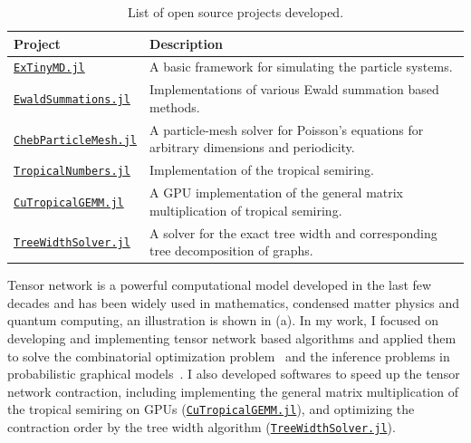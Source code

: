 \begin{table}[!htb]
    \centering
    \begin{tabular}{|l|l|}
        \hline
        \textbf{Project} & \textbf{Description} \\
        \hline
        \href{https://github.com/HPMolSim/ExTinyMD.jl}{\texttt{ExTinyMD.jl}} & A basic framework for simulating the particle systems. \\
        \hline
        \href{https://github.com/HPMolSim/EwaldSummations.jl}{\texttt{EwaldSummations.jl}} & Implementations of various Ewald summation based methods. \\
        \hline
        \href{https://github.com/HPMolSim/ChebParticleMesh.jl}{\texttt{ChebParticleMesh.jl}} & A particle-mesh solver for Poisson's equations for arbitrary dimensions and periodicity. \\
        \hline
        \href{https://github.com/TensorBFS/TropicalNumbers.jl}{\texttt{TropicalNumbers.jl}} & Implementation of the tropical semiring. \\
        \hline
        \href{https://github.com/TensorBFS/CuTropicalGEMM.jl}{\texttt{CuTropicalGEMM.jl}} & A GPU implementation of the general matrix multiplication of tropical semiring. \\
        \hline
        \href{https://github.com/ArrogantGao/TreeWidthSolver.jl}{\texttt{TreeWidthSolver.jl}} & A solver for the exact tree width and corresponding tree decomposition of graphs. \\
        \hline
    \end{tabular}
    \caption{List of open source projects developed.}
    \label{tab:open_source_projects}
\end{table}

Tensor network is a powerful computational model developed in the last few decades and has been widely used in mathematics, condensed matter physics and quantum computing, an illustration is shown in  (a).
In my work, I focused on developing and implementing tensor network based algorithms and applied them to solve the combinatorial optimization problem~\cite{tensorbranching,complexitypaper} and the inference problems in probabilistic graphical models~\cite{roa2024probabilistic}.
I also developed softwares to speed up the tensor network contraction, including implementing the general matrix multiplication of the tropical semiring on GPUs (\href{https://github.com/TensorBFS/CuTropicalGEMM.jl}{\texttt{CuTropicalGEMM.jl}}), and optimizing the contraction order by the tree width algorithm (\href{https://github.com/ArrogantGao/TreeWidthSolver.jl}{\texttt{TreeWidthSolver.jl}}).

